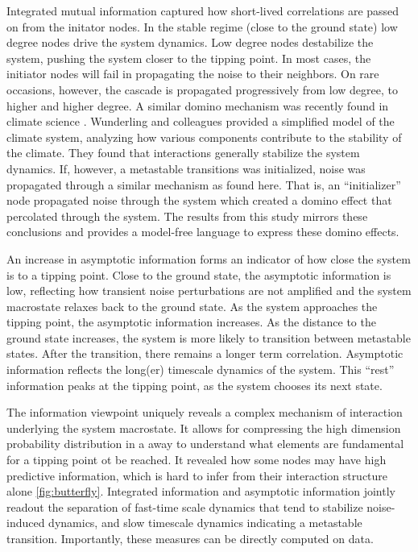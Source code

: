 \documentclass[a4paper, 11pt, twocolumn]{article}
\begin{document}
Integrated  mutual  information   captured  how  short-lived
correlations are passed  on from the initator  nodes. In the
stable regime (close  to the ground state)  low degree nodes
drive the system dynamics.  Low degree nodes destabilize the
system, pushing the  system closer to the  tipping point. In
most cases, the initiator nodes will fail in propagating the
noise to  their neighbors.  On rare occasions,  however, the
cascade  is propagated  progressively  from  low degree,  to
higher  and higher  degree. A  similar domino  mechanism was
recently        found        in       climate        science
\cite{Wunderling2020,Wunderling2021}.      Wunderling      and
colleagues  provided  a  simplified  model  of  the  climate
system, analyzing  how various components contribute  to the
stability  of  the  climate. They  found  that  interactions
generally  stabilize the  system  dynamics.  If, however,  a
metastable transitions was initialized, noise was propagated
through  a similar  mechanism  as found  here.  That is,  an
``initializer'' node propagated noise through the system which
created a domino effect  that percolated through the system.
The results  from this  study mirrors these  conclusions and
provides  a  model-free  language to  express  these  domino
effects.

An increase in asymptotic  information forms an indicator of
how close  the system is  to a  tipping point. Close  to the
ground state, the asymptotic  information is low, reflecting
how transient noise perturbations  are not amplified and the
system macrostate relaxes  back to the ground  state. As the
system   approaches  the   tipping  point,   the  asymptotic
information increases.  As the distance to  the ground state
increases, the  system is more likely  to transition between
metastable  states. After  the transition,  there remains  a
longer term correlation. Asymptotic information reflects the
long(er)  timescale  dynamics  of the  system.  This  ``rest''
information  peaks  at  the  tipping point,  as  the  system
chooses its next state.

The  information   viewpoint  uniquely  reveals   a  complex
mechanism of  interaction underlying the  system macrostate.
It  allows for  compressing the  high dimension  probability
distribution  in  a away  to  understand  what elements  are
fundamental for a  tipping point ot be  reached. It revealed
how some  nodes may have high  predictive information, which
is  hard to  infer  from their  interaction structure  alone
\cref{fig:butterfly}. Integrated  information and asymptotic
information  jointly  readout  the separation  of  fast-time
scale   dynamics  that   tend  to   stabilize  noise-induced
dynamics,   and  slow   timescale   dynamics  indicating   a
metastable  transition. Importantly,  these measures  can be
directly computed on data.
\end{document}
